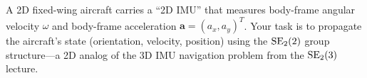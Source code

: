 \documentclass[../AAE590LGM_HW3.tex]{subfiles}
\begin{document}
A 2D fixed-wing aircraft carries a ``2D IMU'' that measures body-frame angular velocity $\omega$ and body-frame acceleration $\bm{a} = (a_x, a_y)^T$. Your task is to propagate the aircraft's state (orientation, velocity, position) using the $\text{SE}_{2}(2)$ group structure---a 2D analog of the 3D IMU navigation problem from the $\text{SE}_{2}(3)$ lecture.
\end{document}
